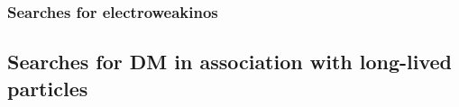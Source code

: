 
\subsubsection{Searches for electroweakinos}



\subsection{Searches for DM in association with long-lived particles}
\label{sec:results_LLPSearches}





%
%
%
%
%


%
%
%
%
%

